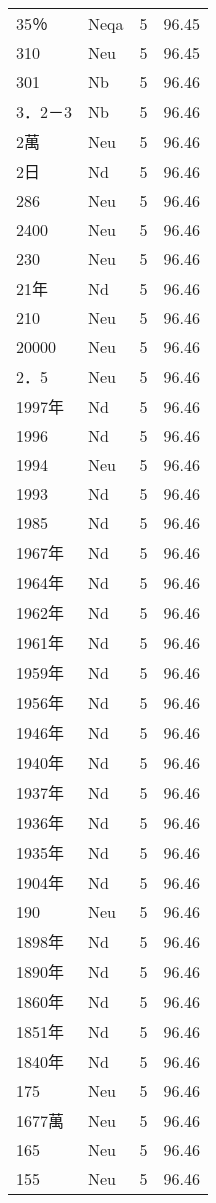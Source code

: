 \documentclass[twocolumn]{book}
\begin{document}
\begin{supertabular}{llrr}
35％ & Neqa & 5 &  96.45\\
310 & Neu & 5 &  96.45\\
301 & Nb & 5 &  96.46\\
3．2－3 & Nb & 5 &  96.46\\
2萬 & Neu & 5 &  96.46\\
2日 & Nd & 5 &  96.46\\
286 & Neu & 5 &  96.46\\
2400 & Neu & 5 &  96.46\\
230 & Neu & 5 &  96.46\\
21年 & Nd & 5 &  96.46\\
210 & Neu & 5 &  96.46\\
20000 & Neu & 5 &  96.46\\
2．5 & Neu & 5 &  96.46\\
1997年 & Nd & 5 &  96.46\\
1996 & Nd & 5 &  96.46\\
1994 & Neu & 5 &  96.46\\
1993 & Nd & 5 &  96.46\\
1985 & Nd & 5 &  96.46\\
1967年 & Nd & 5 &  96.46\\
1964年 & Nd & 5 &  96.46\\
1962年 & Nd & 5 &  96.46\\
1961年 & Nd & 5 &  96.46\\
1959年 & Nd & 5 &  96.46\\
1956年 & Nd & 5 &  96.46\\
1946年 & Nd & 5 &  96.46\\
1940年 & Nd & 5 &  96.46\\
1937年 & Nd & 5 &  96.46\\
1936年 & Nd & 5 &  96.46\\
1935年 & Nd & 5 &  96.46\\
1904年 & Nd & 5 &  96.46\\
190 & Neu & 5 &  96.46\\
1898年 & Nd & 5 &  96.46\\
1890年 & Nd & 5 &  96.46\\
1860年 & Nd & 5 &  96.46\\
1851年 & Nd & 5 &  96.46\\
1840年 & Nd & 5 &  96.46\\
175 & Neu & 5 &  96.46\\
1677萬 & Neu & 5 &  96.46\\
165 & Neu & 5 &  96.46\\
155 & Neu & 5 &  96.46\\

\end{supertabular}
\end{document}

